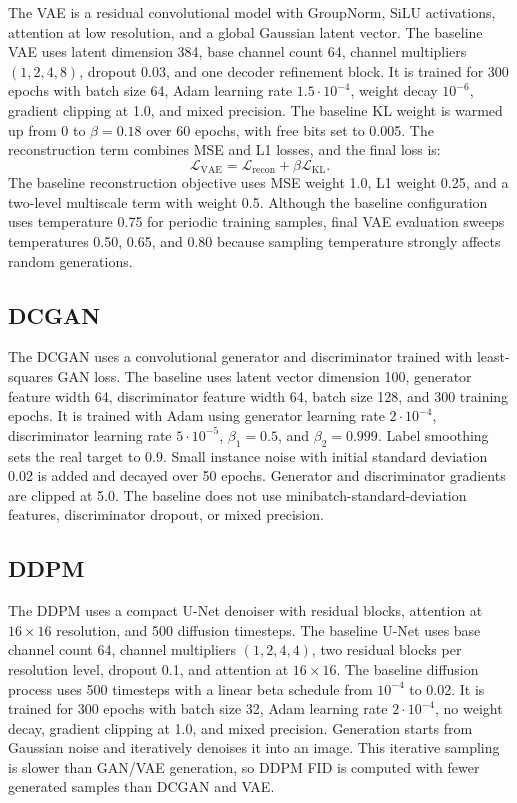 \documentclass[11pt,a4paper]{article}
\begin{document}
The VAE is a residual convolutional model with GroupNorm, SiLU activations, attention at low resolution, and a global Gaussian latent vector.
The baseline VAE uses latent dimension 384, base channel count 64, channel multipliers $(1,2,4,8)$, dropout 0.03, and one decoder refinement block.
It is trained for 300 epochs with batch size 64, Adam learning rate $1.5\cdot10^{-4}$, weight decay $10^{-6}$, gradient clipping at 1.0, and mixed precision.
The baseline KL weight is warmed up from 0 to $\beta=0.18$ over 60 epochs, with free bits set to 0.005.
The reconstruction term combines MSE and L1 losses, and the final loss is:
\begin{equation}
  \mathcal{L}_{\text{VAE}} =
  \mathcal{L}_{\text{recon}} + \beta \mathcal{L}_{\text{KL}}.
\end{equation}
The baseline reconstruction objective uses MSE weight 1.0, L1 weight 0.25, and a two-level multiscale term with weight 0.5.
Although the baseline configuration uses temperature 0.75 for periodic training samples, final VAE evaluation sweeps temperatures 0.50, 0.65, and 0.80 because sampling temperature strongly affects random generations.

\subsection{DCGAN}

The DCGAN uses a convolutional generator and discriminator trained with least-squares GAN loss.
The baseline uses latent vector dimension 100, generator feature width 64, discriminator feature width 64, batch size 128, and 300 training epochs.
It is trained with Adam using generator learning rate $2\cdot10^{-4}$, discriminator learning rate $5\cdot10^{-5}$, $\beta_1=0.5$, and $\beta_2=0.999$.
Label smoothing sets the real target to 0.9.
Small instance noise with initial standard deviation 0.02 is added and decayed over 50 epochs.
Generator and discriminator gradients are clipped at 5.0.
The baseline does not use minibatch-standard-deviation features, discriminator dropout, or mixed precision.

\subsection{DDPM}

The DDPM uses a compact U-Net denoiser with residual blocks, attention at $16\times16$ resolution, and 500 diffusion timesteps.
The baseline U-Net uses base channel count 64, channel multipliers $(1,2,4,4)$, two residual blocks per resolution level, dropout 0.1, and attention at $16\times16$.
The baseline diffusion process uses 500 timesteps with a linear beta schedule from $10^{-4}$ to 0.02.
It is trained for 300 epochs with batch size 32, Adam learning rate $2\cdot10^{-4}$, no weight decay, gradient clipping at 1.0, and mixed precision.
Generation starts from Gaussian noise and iteratively denoises it into an image.
This iterative sampling is slower than GAN/VAE generation, so DDPM FID is computed with fewer generated samples than DCGAN and VAE.
\end{document}
